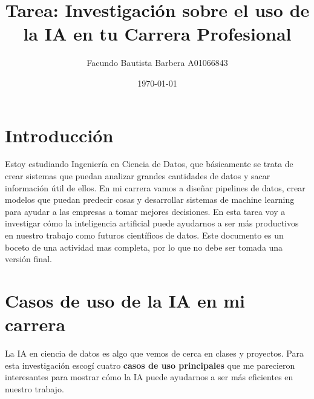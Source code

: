 \documentclass[11pt]{article}
\begin{document}
\title{
	Tarea: Investigaci\'on sobre el uso de la IA en tu Carrera Profesional
}
\author{
	Facundo Bautista Barbera A01066843
}
\date{\today}
\maketitle

\section*{Introducci\'on}

Estoy estudiando Ingenier\'ia en Ciencia de Datos, que b\'asicamente se trata de crear sistemas que puedan analizar grandes cantidades de datos y sacar informaci\'on \'util de ellos. En mi carrera vamos a dise\~nar pipelines de datos, crear modelos que puedan predecir cosas y desarrollar sistemas de machine learning para ayudar a las empresas a tomar mejores decisiones. En esta tarea voy a investigar c\'omo la inteligencia artificial puede ayudarnos a ser m\'as productivos en nuestro trabajo como futuros cient\'ificos de datos.
Este documento es un boceto de una actividad mas completa, por lo que no debe ser tomada una versión final.

\section*{Casos de uso de la IA en mi carrera}

La IA en ciencia de datos es algo que vemos de cerca en clases y proyectos. Para esta investigaci\'on escog\'i cuatro \textbf{casos de uso principales} que me parecieron interesantes para mostrar c\'omo la IA puede ayudarnos a ser m\'as eficientes en nuestro trabajo.
\end{document}

